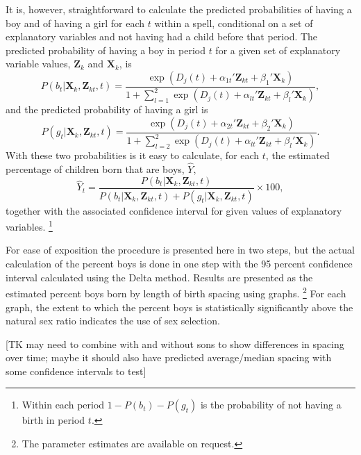 \documentclass[12pt,letterpaper]{article}
\begin{document}
It is, however, straightforward to calculate the predicted probabilities of 
having a boy and of having a girl for each $t$ within a spell, conditional on 
a set of explanatory variables and not having had a child before that period.
The predicted probability of having a boy in period $t$ for a given set of 
explanatory variable values, $\mathbf{Z}_k$ and $\mathbf{X}_k$, is
\begin{equation}
P(b_{t} | \mathbf{X}_{k}, \mathbf{Z}_{kt}, t ) 
=  
\frac{ \exp(D_j(t) + \alpha_{1t}' \mathbf{Z}_{kt} + \beta_1' \mathbf{X}_{k} )}
{1 + \sum_{l=1}^2 \exp(D_j(t) + \alpha_{lt} ' \mathbf{Z}_{kt} + \beta_l ' \mathbf{X}_{k})},
\label{eq:probability_boy}
\end{equation}
and the predicted probability of having a girl is
\begin{equation}
P(g_{t} | \mathbf{X}_{k}, \mathbf{Z}_{kt},t ) 
=  
\frac{ \exp(D_j(t) + \alpha_{2t}'\mathbf{Z}_{kt} + \beta_2'\mathbf{X}_{k} )}
{1 + \sum_{l=2}^2 \exp(D_j(t) + \alpha_{lt}'\mathbf{Z}_{kt} + \beta_l'\mathbf{X}_{k})}.
\label{eq:probability_girl}
\end{equation}
With these two probabilities is it easy to calculate, for each $t$, the estimated
percentage of children born that are boys, $\hat{Y}$, 
\begin{equation}
\hat{Y}_t 
= 
\frac{ P(b_{t} | \mathbf{X}_{k}, \mathbf{Z}_{kt},t )}
{ P(b_{t} | \mathbf{X}_{k}, \mathbf{Z}_{kt},t) + P(g_{t} | \mathbf{X}_{k}, \mathbf{Z}_{kt},t )} 
\times 100,
\label{eq:probability_son}
\end{equation}
together with the associated confidence interval for given values of explanatory 
variables.%
\footnote{
Within each period $1-P(b_{t})-P(g_{t})$ is the probability of not having a birth in 
period $t$.
}

For ease of exposition the procedure is presented here in two steps, but the actual
calculation of the percent boys is done in one step with the 95 percent confidence 
interval calculated using the Delta method.
Results are presented as the estimated percent boys born by length of birth spacing
using graphs.%
\footnote{
The parameter estimates are available on request.
}
For each graph, the extent to which the percent boys is statistically 
significantly above the natural sex ratio indicates the use of sex selection.


[TK  may need to combine with and without sons to show differences in spacing 
over time; maybe it should also have predicted average/median spacing with some 
confidence intervals to test]
\end{document}
